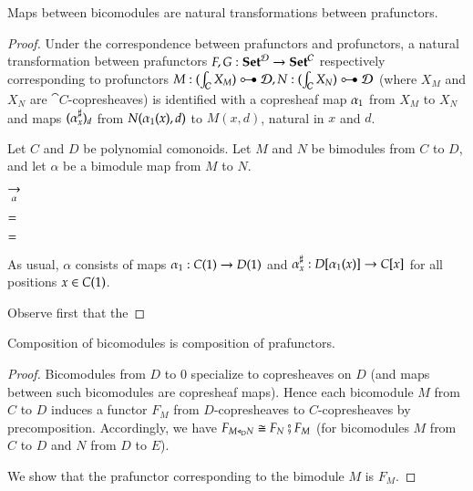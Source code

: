 \documentclass{amsart}
\begin{document}
\begin{prop}
  Maps between bicomodules are natural transformations between prafunctors.
\end{prop}
\begin{proof}
  Under the correspondence between prafunctors and profunctors, a
  natural transformation between prafunctors
  $F, G: {\normalfont\mathbf{Set}}^{\mathcal{D}} \to {\normalfont\mathbf{Set}}^{\mathcal{C}}$ respectively corresponding
  to profunctors
  $M : (\int_{\cat{C}} X_M) \prof \cat{D}, N : (\int_{\cat{C}} X_N)
  \prof \cat{D}$ (where $X_M$ and $X_N$ are $\cat{C}$-copresheaves) is
  identified with a copresheaf map ${\alpha}_1$ from $X_M$ to
  $X_N$ and maps $({\alpha}^\sharp_{x})_d$ from
  $N({\alpha}_1(x), d)$ to $M(x, d)$, natural in $x$ and $d$.

  Let $C$ and $D$ be polynomial comonoids. Let $M$ and $N$ be
  bimodules from $C$ to $D$, and let $\alpha$ be a bimodule map from
  $M$ to $N$.

  \begin{center}
    
    \hspace{-.75em}
    $\underset{\alpha}{\to}$
    \hspace{.5em}
    
  \end{center}

  \begin{center}
    $=$
    \quad
  \end{center}

  \begin{center}
    $=$
    \quad
  \end{center}


  As usual, $\alpha$ consists of maps
  ${\alpha}_1: C(1) \to D(1)$ and
  ${\alpha}^\sharp_{x}: D[{\alpha}_1(x)] \to C[x]$
  for all positions $x \in C(1)$.

  Observe first that the 
\end{proof}

\begin{prop}
  Composition of bicomodules is composition of prafunctors.
\end{prop}
\begin{proof}
  Bicomodules from $D$ to $0$ specialize to copresheaves on $D$ (and maps
  between such bicomodules are copresheaf maps). Hence each bicomodule
  $M$ from $C$ to $D$ induces a functor $F_M$ from $D$-copresheaves to
  $C$-copresheaves by precomposition. Accordingly, we have
  $F_{M \mathrel{\triangleleft}_D N} \cong F_N \fatsemi F_M$ (for bicomodules $M$ from
  $C$ to $D$ and $N$ from $D$ to $E$).
  
  We show that the prafunctor corresponding to the bimodule $M$ is
  $F_M$.

  
\end{proof}
\end{document}
